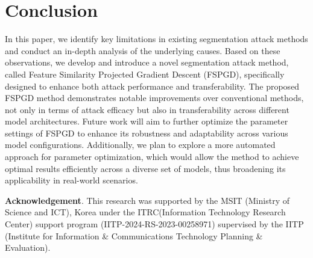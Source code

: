 \section{Conclusion}
\label{sec6:conclusion}

In this paper, we identify key limitations in existing segmentation attack methods and conduct an in-depth analysis of the underlying causes. Based on these observations, we develop and introduce a novel segmentation attack method, called Feature Similarity Projected Gradient Descent (FSPGD), specifically designed to enhance both attack performance and transferability. The proposed FSPGD method demonstrates notable improvements over conventional methods, not only in terms of attack efficacy but also in transferability across different model architectures. Future work will aim to further optimize the parameter settings of FSPGD to enhance its robustness and adaptability across various model configurations. Additionally, we plan to explore a more automated approach for parameter optimization, which would allow the method to achieve optimal results efficiently across a diverse set of models, thus broadening its applicability in real-world scenarios.



\noindent
\textbf{Acknowledgement}. This research was supported by the MSIT (Ministry of Science and ICT), Korea under the ITRC(Information Technology Research Center) support program (IITP-2024-RS-2023-00258971) supervised by the IITP (Institute for Information \& Communications Technology Planning \& Evaluation).
\newpage

